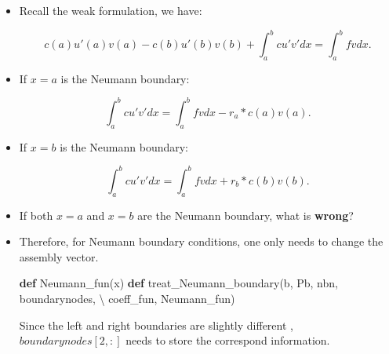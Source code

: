 \documentclass[11pt]{article}
\newenvironment{Shaded}{}{}
\newcommand{\KeywordTok}[1]{\textcolor[rgb]{0.00,0.44,0.13}{\textbf{{#1}}}}
\newcommand{\NormalTok}[1]{{#1}}
\newcommand{\OperatorTok}[1]{\textcolor[rgb]{0.40,0.40,0.40}{{#1}}}
\begin{document}
\begin{itemize}
\item
  Recall the weak formulation, we have:

  \begin{equation}
  c(a)u'(a)v(a) - c(b)u'(b)v(b) + \int_a^b cu'v'dx = \int_a^b fv dx.
  \end{equation}
\item
  If \(x = a\) is the Neumann boundary:

  \begin{equation}
   \int_a^b cu'v'dx = \int_a^b fv dx - r_a*c(a)v(a).
  \end{equation}
\item
  If \(x = b\) is the Neumann boundary:

  \begin{equation}
   \int_a^b cu'v'dx = \int_a^b fv dx + r_b*c(b)v(b).
  \end{equation}
\item
  If both \(x = a\) and \(x = b\) are the Neumann boundary, what is
  \textbf{wrong}?
\item
  Therefore, for Neumann boundary conditions, one only needs to change
  the assembly vector.

\begin{Shaded}
\begin{Highlighting}[]
\KeywordTok{def}\NormalTok{ Neumann_fun(x)}
\KeywordTok{def}\NormalTok{ treat_Neumann_boundary(b, Pb, nbn, boundarynodes, }\OperatorTok{\textbackslash{}}
\NormalTok{                            coeff_fun, Neumann_fun)}
\end{Highlighting}
\end{Shaded}

  Since the left and right boundaries are slightly different ,
  \(boundarynodes[2,:]\) needs to store the correspond information.
\end{itemize}
\end{document}
